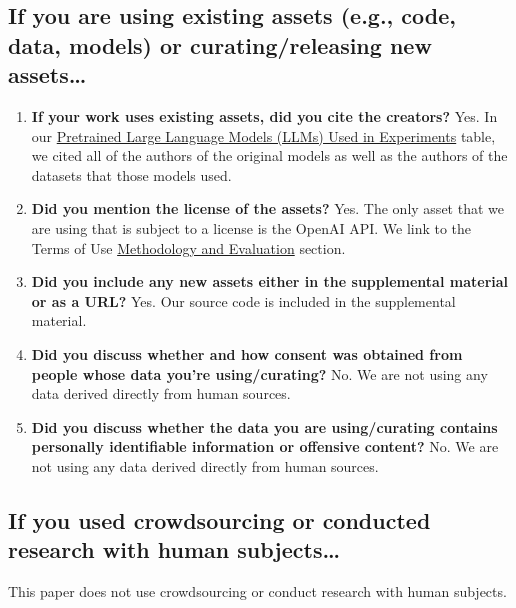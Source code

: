 \documentclass{article}
\begin{document}
\subsection{If you are using existing assets (e.g., code, data, models) or curating/releasing new assets\dots}
\begin{enumerate}
  \item \textbf{If your work uses existing assets, did you cite the creators?} Yes. In our   \hyperref[tab:llms]{Pretrained Large Language Models (LLMs) Used in Experiments} table, we cited all of the authors of the original models as well as the authors of the datasets that those models used.
  \item \textbf{Did you mention the license of the assets?} Yes. The only asset that we are using that is subject to a license is the OpenAI API. We link to the Terms of Use \hyperref[para:methodology]{Methodology and Evaluation} section.
  \item \textbf{Did you include any new assets either in the supplemental material or as a URL?} Yes. Our source code is included in the supplemental material.
  \item \textbf{Did you discuss whether and how consent was obtained from people whose data you're using/curating?} No. We are not using any data derived directly from human sources.
  \item \textbf{Did you discuss whether the data you are using/curating contains personally identifiable information or offensive content?} No.  We are not using any data derived directly from human sources.
\end{enumerate}
\subsection{If you used crowdsourcing or conducted research with human subjects\dots}
This paper does not use crowdsourcing or conduct research with human subjects.
\printbibliography{}
\end{document}
